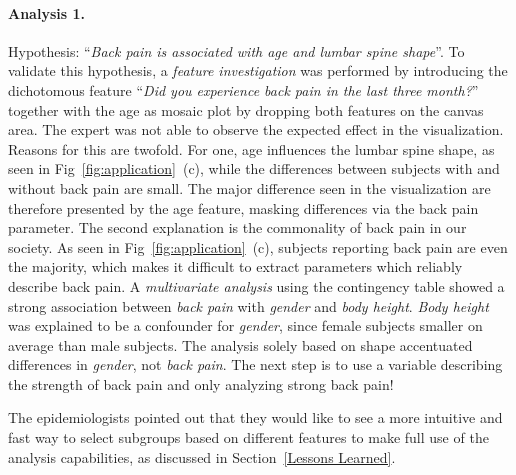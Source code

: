 \documentclass[journal]{style/vgtc} 			          %
\begin{document}
\paragraph{Analysis 1.}
Hypothesis: ``\emph{Back pain is associated with age and lumbar spine shape}''.
%
To validate this hypothesis, a \emph{feature investigation} was performed by introducing the dichotomous feature ``\emph{Did you experience back pain in the last three month?}'' together with the age as mosaic plot by dropping both features on the canvas area.
%
The expert was not able to observe the expected effect in the visualization.
%
Reasons for this are twofold.
%
For one, age influences the lumbar spine shape, as seen in Fig~\ref{fig:application}~(c), while the differences between subjects with and without back pain are small.
%
The major difference seen in the visualization are therefore presented by the age feature, masking differences via the back pain parameter.
%
The second explanation is the commonality of back pain in our society.
%
As seen in Fig~\ref{fig:application}~(c), subjects reporting back pain are even the majority, which makes it difficult to extract parameters which reliably describe back pain.
%
A \emph{multivariate analysis} using the contingency table showed a strong association between \emph{back pain} with \emph{gender} and \emph{body height}.
%
\emph{Body height} was explained to be a confounder for \emph{gender}, since female subjects smaller on average than male subjects.
%
The analysis solely based on shape accentuated differences in \emph{gender}, not \emph{back pain}.
%
The next step is to use a variable describing the strength of back pain and only analyzing strong back pain!

The epidemiologists pointed out that they would like to see a more intuitive and fast way to select subgroups based on different features to make full use of the analysis capabilities, as discussed in Section~\ref{Lessons Learned}.
\end{document}
